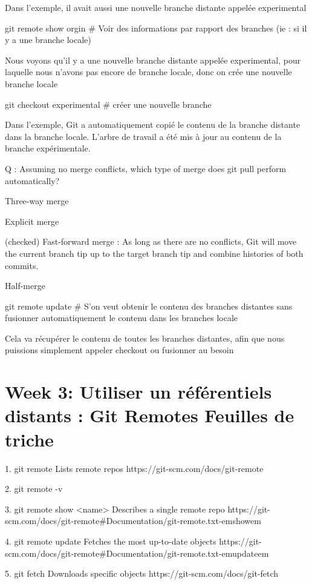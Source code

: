 \documentclass[11pt, onecolumn]{article}
\begin{document}
Dans l'exemple, il avait aussi une nouvelle branche distante appelée experimental

git remote show orgin    # Voir des informations par rapport des branches (ie : si il y a une branche locale)

Nous voyons qu'il y a une nouvelle branche distante appelée experimental, pour laquelle nous n'avons pas encore de branche locale, donc on crée une nouvelle branche locale

git checkout experimental     # créer une nouvelle branche 

Dans l'exemple, Git a automatiquement copié le contenu de la branche distante dans la branche locale.
L'arbre de travail a été mis à jour au contenu de la branche expérimentale.


Q : Assuming no merge conflicts, which type of merge does git pull perform automatically?

Three-way merge

Explicit merge

(checked) Fast-forward merge   : As long as there are no conflicts, Git will move the current branch tip up to the target branch tip and combine histories of both commits.

Half-merge

git remote update    # S'on veut obtenir le contenu des branches distantes sans fusionner automatiquement le contenu dans les branches locale

Cela va récupérer le contenu de toutes les branches distantes, afin que nous puissions simplement appeler checkout ou fusionner au besoin


\section{Week 3: Utiliser un référentiels distants : Git Remotes Feuilles de triche}

1. git remote     Lists remote repos  https://git-scm.com/docs/git-remote

2. git remote -v

3. git remote show <name>		Describes a single remote repo https://git-scm.com/docs/git-remote#Documentation/git-remote.txt-emshowem

4. git remote update   Fetches the most up-to-date objects https://git-scm.com/docs/git-remote#Documentation/git-remote.txt-emupdateem

5. git fetch  Downloads specific objects https://git-scm.com/docs/git-fetch
\end{document}
